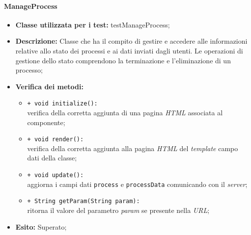 \paragraph{ManageProcess}
\begin{flushleft}
\begin{itemize}
\item \textbf{Classe utilizzata per i test:} testManageProcess;
\item \textbf{Descrizione:} Classe che ha il compito di gestire e accedere alle informazioni relative allo stato dei processi e ai dati inviati dagli utenti. Le operazioni di gestione dello stato comprendono la terminazione e l'eliminazione di un processo;
\item \textbf{Verifica dei metodi:}
\begin{sloppypar}
\begin{itemize}
\item \texttt{+ void initialize():}\\ verifica della corretta aggiunta di una pagina \textit{HTML} associata al componente;
\item \texttt{+ void render():}\\ verifica della corretta aggiunta alla pagina \textit{HTML} del \textit{template} campo dati della classe;
\item \texttt{+ void update():}\\ aggiorna i campi dati \texttt{process} e \texttt{processData} comunicando con il \textit{server};
\item \texttt{+ String getParam(String param):}\\ ritorna il valore del parametro \textit{param} se presente nella \textit{URL};
\end{itemize}
\end{sloppypar}
\item \textbf{Esito:} Superato;
\end{itemize}
\end{flushleft}

